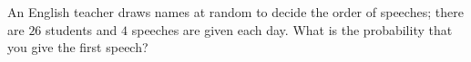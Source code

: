 An English teacher draws names at random to decide the order of speeches; there are $26$ students and $4$ speeches are given each day. What is the probability that you give the first speech?
